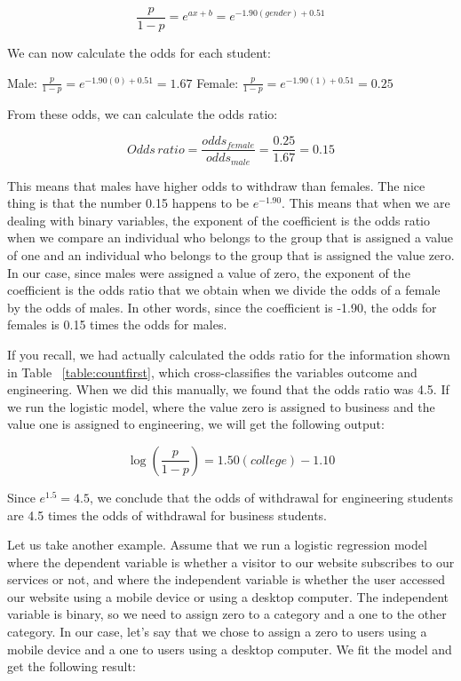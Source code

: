 \documentclass[a4paper,12pt,oneside]{book}
\begin{document}
$$ \frac{p}{1-p}=e^{ax+b}=e^{-1.90(gender)+0.51} $$

We can now calculate the odds for each student:

Male: $ \frac{p}{1-p}=e^{-1.90(0)+0.51}=1.67 $
Female: $ \frac{p}{1-p}=e^{-1.90(1)+0.51}=0.25 $

From these odds, we can calculate the odds ratio:

$$ Odds\, ratio = \frac{odds_{female}}{odds_{male}}=\frac{0.25}{1.67}=0.15 $$

This means that males have higher odds to withdraw than females. The nice thing is that the number 0.15 happens to be $e^{-1.90}$. This means that when we are dealing with binary variables, 
the exponent of the coefficient is the odds ratio when we compare an individual who belongs to the group that is assigned a value of one and an individual who belongs to the group that is 
assigned the value zero. In our case, since males were assigned a value of zero, the exponent of the coefficient is the odds ratio that we obtain when we divide the odds of a female by the 
odds of males. In other words, since the coefficient is -1.90, the odds for females is 0.15 times the odds for males.

If you recall, we had actually calculated the odds ratio for the information shown in Table ~\ref{table:countfirst}, which cross-classifies the variables outcome and engineering. 
When we did this manually, we found that the odds ratio was 4.5. If we run the logistic model, where the value zero is assigned to business and the value one is 
assigned to engineering, we will get the following output:

$$ \log(\frac{p}{1-p})=1.50(college)-1.10 $$

Since $e^{1.5}=4.5$, we conclude that the odds of withdrawal for engineering students are 4.5 times the odds of withdrawal for business students. 

Let us take another example. Assume that we run a logistic regression model where the dependent variable is whether a visitor to our website subscribes to our services or not, 
and where the independent variable is whether the user accessed our website using a mobile device or using a desktop computer. The independent variable is binary, so we need to 
assign zero to a category and a one to the other category. In our case, let’s say that we chose to assign a zero to users using a mobile device and a one to users using a desktop 
computer. We fit the model and get the following result:
\end{document}
